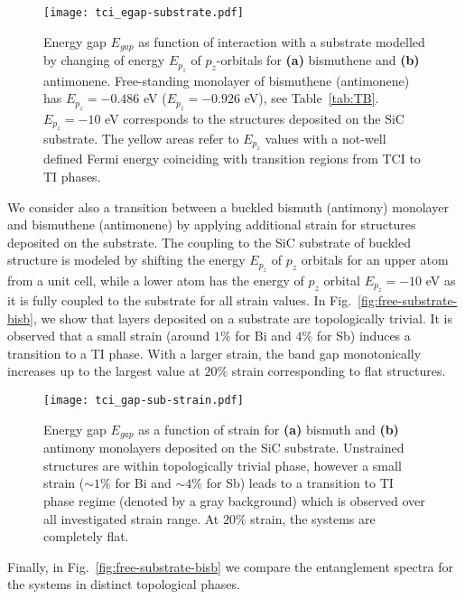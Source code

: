 \begin{figure}[H]
\centering
\texttt{[image: tci\_egap-substrate.pdf]}
\caption[Energy gap $E_{gap}$ as function of interaction with a substrate]{Energy gap $E_{gap}$ as function of interaction with a substrate modelled by changing of energy $E_{p_z}$ of $p_z$-orbitals for \textbf{(a)} bismuthene and \textbf{(b)} antimonene. Free-standing monolayer of bismuthene (antimonene) has $E_{p_z}= - 0.486$ eV ($ E_{p_z} = - 0.926$ eV), see Table~\ref{tab:TB}. $E_{p_z} = - 10$ eV corresponds to the structures deposited on the SiC substrate. The yellow areas refer to $E_{p_z}$ values with a not-well defined Fermi energy coinciding with transition regions from TCI to TI phases.}
\label{fig:egap-substrate}
\end{figure}

We consider also a transition between a buckled bismuth (antimony) monolayer and bismuthene (antimonene) by applying additional strain for structures deposited on the substrate. The coupling to the SiC substrate of buckled structure is modeled by shifting the energy $E_{p_z}$ of $p_z$ orbitals for an upper atom from a unit cell, while a lower atom has the energy of $p_z$ orbital $E_{p_z} = - 10$ eV as it is fully coupled to the substrate for all strain values. In Fig.~\ref{fig:free-substrate-bisb}, we show that layers deposited on a substrate are topologically trivial. It is observed that a small strain (around $1 \%$ for Bi and $4\%$ for Sb) induces a transition to a TI phase. With a larger strain, the band gap monotonically increases up to the largest value at $20\%$ strain corresponding to flat structures.

\begin{figure}[H]
\centering
\texttt{[image: tci\_gap-sub-strain.pdf]}
\caption[Energy gap $E_{gap}$ as a function of strain for bismuth and antimony monolayers deposited on the SiC substrate]{Energy gap $E_{gap}$ as a function of strain for \textbf{(a)} bismuth and \textbf{(b)} antimony monolayers deposited on the SiC substrate. Unstrained structures are within topologically trivial phase, however a small strain ($ \sim 1 \%$ for Bi and $\sim 4\%$ for Sb) leads to a transition to TI phase regime (denoted by a gray background) which is observed over all investigated strain range. At $20\%$ strain, the systems are completely flat.}
\label{fig:egap-substrate-strain}
\end{figure}

Finally, in Fig.~\ref{fig:free-substrate-bisb} we compare the entanglement spectra for the systems in distinct topological phases.

